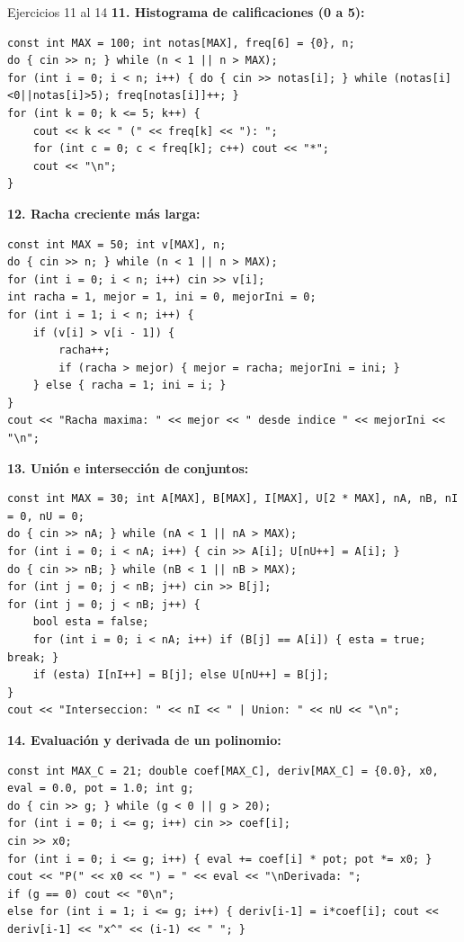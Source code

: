 \documentclass[11pt,letterpaper]{article}
\begin{document}
\begin{solucion}{Ejercicios 11 al 14}
\textbf{11. Histograma de calificaciones (0 a 5):}
\begin{lstlisting}[style=cppmonitoria]
const int MAX = 100; int notas[MAX], freq[6] = {0}, n;
do { cin >> n; } while (n < 1 || n > MAX);
for (int i = 0; i < n; i++) { do { cin >> notas[i]; } while (notas[i]<0||notas[i]>5); freq[notas[i]]++; }
for (int k = 0; k <= 5; k++) {
    cout << k << " (" << freq[k] << "): ";
    for (int c = 0; c < freq[k]; c++) cout << "*";
    cout << "\n";
}
\end{lstlisting}

\textbf{12. Racha creciente más larga:}
\begin{lstlisting}[style=cppmonitoria]
const int MAX = 50; int v[MAX], n;
do { cin >> n; } while (n < 1 || n > MAX);
for (int i = 0; i < n; i++) cin >> v[i];
int racha = 1, mejor = 1, ini = 0, mejorIni = 0;
for (int i = 1; i < n; i++) {
    if (v[i] > v[i - 1]) {
        racha++;
        if (racha > mejor) { mejor = racha; mejorIni = ini; }
    } else { racha = 1; ini = i; }
}
cout << "Racha maxima: " << mejor << " desde indice " << mejorIni << "\n";
\end{lstlisting}

\textbf{13. Unión e intersección de conjuntos:}
\begin{lstlisting}[style=cppmonitoria]
const int MAX = 30; int A[MAX], B[MAX], I[MAX], U[2 * MAX], nA, nB, nI = 0, nU = 0;
do { cin >> nA; } while (nA < 1 || nA > MAX);
for (int i = 0; i < nA; i++) { cin >> A[i]; U[nU++] = A[i]; }
do { cin >> nB; } while (nB < 1 || nB > MAX);
for (int j = 0; j < nB; j++) cin >> B[j];
for (int j = 0; j < nB; j++) {
    bool esta = false;
    for (int i = 0; i < nA; i++) if (B[j] == A[i]) { esta = true; break; }
    if (esta) I[nI++] = B[j]; else U[nU++] = B[j];
}
cout << "Interseccion: " << nI << " | Union: " << nU << "\n";
\end{lstlisting}

\textbf{14. Evaluación y derivada de un polinomio:}
\begin{lstlisting}[style=cppmonitoria]
const int MAX_C = 21; double coef[MAX_C], deriv[MAX_C] = {0.0}, x0, eval = 0.0, pot = 1.0; int g;
do { cin >> g; } while (g < 0 || g > 20);
for (int i = 0; i <= g; i++) cin >> coef[i];
cin >> x0;
for (int i = 0; i <= g; i++) { eval += coef[i] * pot; pot *= x0; }
cout << "P(" << x0 << ") = " << eval << "\nDerivada: ";
if (g == 0) cout << "0\n";
else for (int i = 1; i <= g; i++) { deriv[i-1] = i*coef[i]; cout << deriv[i-1] << "x^" << (i-1) << " "; }
\end{lstlisting}
\end{solucion}
\end{document}
